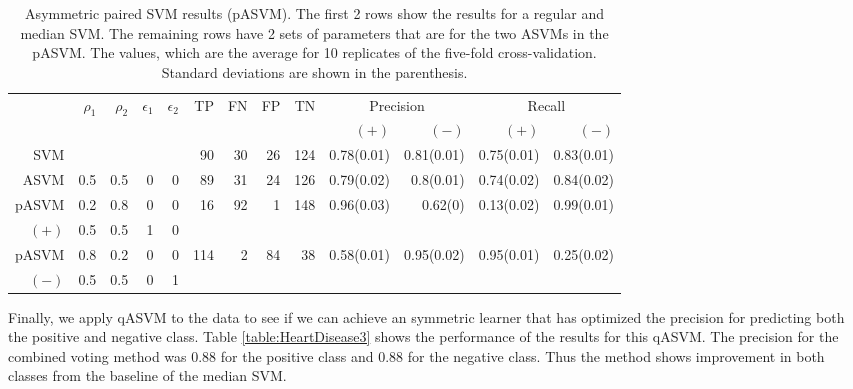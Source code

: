 \documentclass[twoside,11pt]{article}
\begin{document}
\begin{table}[htbp]\label{table:HeartDisease2}
  \centering
    \small\begin{tabular}{rrrrr|rrrrrrrr}
    \hline
    &\multirow{2}{*}{$\rho_1$} & \multirow{2}{*}{$\rho_2$} & \multirow{2}{*}{$\epsilon_1$} & \multirow{2}{*}{$\epsilon_2$} & \multirow{2}{*}{TP}    & \multirow{2}{*}{FN}    & \multirow{2}{*}{FP}    & \multirow{2}{*}{TN} & \multicolumn{2}{c}{Precision} & \multicolumn{2}{c}{Recall}\\
    &&&&&&&&&  $(+)$ &  $(-)$ &  $(+)$ &  $(-)$ \bigstrut\\

\hline
\hline
SVM &       &       &       &       & 90    & 30    & 26    & 124   & 0.78(0.01) & 0.81(0.01) & 0.75(0.01) & 0.83(0.01) \bigstrut\\
\hline
 ASVM & 0.5   & 0.5   & 0     & 0     & 89    & 31    & 24    & 126   & 0.79(0.02) & 0.8(0.01) & 0.74(0.02) & 0.84(0.02) \bigstrut\\
\hline
pASVM & 0.2   & 0.8   & 0     & 0     & 16    & 92    & 1     & 148   & 0.96(0.03) & 0.62(0) & 0.13(0.02) & 0.99(0.01) \bigstrut[t]\\
$(+)$   & 0.5   & 0.5   & 1     & 0     &       &       &       &       &       &       &       &  \bigstrut[b]\\
\hline
pASVM & 0.8   & 0.2   & 0     & 0     & 114   & 2     & 84    & 38    & 0.58(0.01) & 0.95(0.02) & 0.95(0.01) & 0.25(0.02) \bigstrut[t]\\
$(-)$   & 0.5   & 0.5   & 0     & 1     &       &       &       &       &       &       &       &  \bigstrut[b]\\
\hline
\hline
    \end{tabular}%
    \caption{Asymmetric paired SVM results (pASVM). The first 2 rows show the results for a regular and median SVM. The remaining rows have 2 sets of parameters that are for the two ASVMs in the pASVM. The values, which are the average for 10 replicates of the five-fold cross-validation. Standard deviations are shown in the parenthesis.}
\end{table}%
Finally, we apply qASVM to the data to see if we can achieve an symmetric learner that has optimized the precision for predicting both the positive and negative class. Table \ref{table:HeartDisease3} shows the performance of the results for this qASVM. The precision for the combined voting method was 0.88 for the positive class and 0.88 for the negative class. Thus the method shows improvement in both classes from the baseline of the median SVM.
\end{document}
